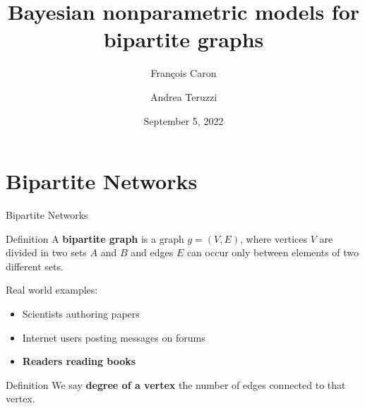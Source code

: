 \documentclass[aspectratio=169,xcolor=dvipsnames]{beamer}
\title[BNP models for bipartite graphs, F. Caron]{Bayesian nonparametric models for bipartite graphs
} \subtitle{François Caron}
\author[Andrea Teruzzi] {Andrea Teruzzi}
\date[20605 - Machine Learning II]{September 5, 2022}
\begin{document}
\begin{frame}
    \titlepage
\end{frame}



\section{Bipartite Networks} %
\begin{frame}{Bipartite Networks}
\begin{block}{Definition}
    A \textbf{bipartite graph} is a graph $g=(V, E)$, where vertices $V$ are divided in two sets $A$ and $B$ and edges $E$ can occur only between elements of two different sets.
    \vspace{5pt}
\end{block}
Real world examples:
\begin{itemize}
    \item Scientists authoring papers
    \item Internet users posting messages on forums
    \item \textbf{Readers reading books}
\end{itemize}
\begin{block}{Definition}
    We say \textbf{degree of a vertex} the number of edges connected to that vertex.
    \vspace{5pt}
\end{block}

\end{frame}
\end{document}
